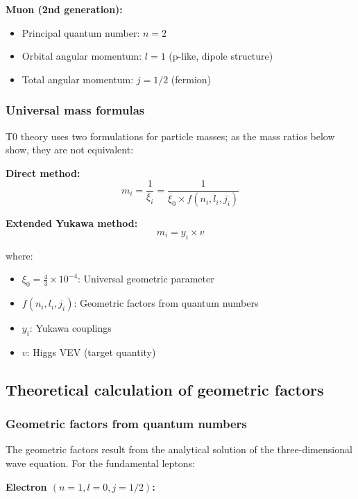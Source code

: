 \textbf{Muon (2nd generation):}
\begin{itemize}
	\item Principal quantum number: $n = 2$
	\item Orbital angular momentum: $l = 1$ (p-like, dipole structure)
	\item Total angular momentum: $j = 1/2$ (fermion)
\end{itemize}

\subsubsection{Universal mass formulas}

T0 theory uses two formulations for particle masses; as the mass ratios below show, they are not equivalent:

\textbf{Direct method:}
\begin{equation}
	m_i = \frac{1}{\xi_i} = \frac{1}{\xi_0 \times f(n_i, l_i, j_i)}
	\label{eq:direct_mass_formula}
\end{equation}

\textbf{Extended Yukawa method:}
\begin{equation}
	m_i = y_i \times v
	\label{eq:yukawa_mass_formula}
\end{equation}

where:
\begin{itemize}
	\item $\xi_0 = \frac{4}{3} \times 10^{-4}$: Universal geometric parameter
	\item $f(n_i, l_i, j_i)$: Geometric factors from quantum numbers
	\item $y_i$: Yukawa couplings
	\item $v$: Higgs VEV (target quantity)
\end{itemize}

\subsection{Theoretical calculation of geometric factors}

\subsubsection{Geometric factors from quantum numbers}

The geometric factors result from the analytical solution of the three-dimensional wave equation. For the fundamental leptons:

\textbf{Electron $(n=1, l=0, j=1/2)$:}

